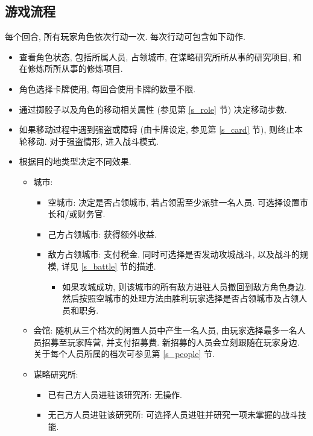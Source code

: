 \documentclass[UTF8, zihao=-4]{ctexart} %
\begin{document}
\subsection{游戏流程}
\label{s_process}
每个回合, 所有玩家角色依次行动一次. 每次行动可包含如下动作.
\begin{itemize}
    \item 查看角色状态, 包括所属人员, 占领城市, 在谋略研究所所从事的研究项目, 和在修炼所所从事的修炼项目.
    \item 角色选择卡牌使用, 每回合使用卡牌的数量不限. 
    \item 通过掷骰子以及角色的移动相关属性 (参见第 \ref{s_role} 节) 决定移动步数. 
    \item 如果移动过程中遇到强盗或障碍 (由卡牌设定, 参见第 \ref{s_card} 节), 则终止本轮移动. 对于强盗情形, 进入战斗模式.
    \item 根据目的地类型决定不同效果.
        \begin{itemize}
            \item 城市:
                \begin{itemize}
                    \item 空城市: 决定是否占领城市, 若占领需至少派驻一名人员. 可选择设置市长和/或财务官.
                    \item 己方占领城市: 获得额外收益. 
                    \item 敌方占领城市: 支付税金. 同时可选择是否发动攻城战斗, 以及战斗的规模, 详见 \ref{s_battle} 节的描述.
                        \begin{itemize}
                            \item 如果攻城成功, 则该城市的所有敌方进驻人员撤回到敌方角色身边. 
                                然后按照空城市的处理方法由胜利玩家选择是否占领城市及占领人员和职务.
                        \end{itemize}
                \end{itemize}
            \item 会馆: 随机从三个档次的闲置人员中产生一名人员, 由玩家选择最多一名人员招募至玩家阵营, 并支付招募费.
                新招募的人员会立刻跟随在玩家身边. 关于每个人员所属的档次可参见第 \ref{s_people} 节.
            \item 谋略研究所:
                \begin{itemize}
                    \item 已有己方人员进驻该研究所: 无操作.
                    \item 无己方人员进驻该研究所: 可选择人员进驻并研究一项未掌握的战斗技能.

\end{itemize}
\end{itemize}
\end{itemize}
\end{document}
